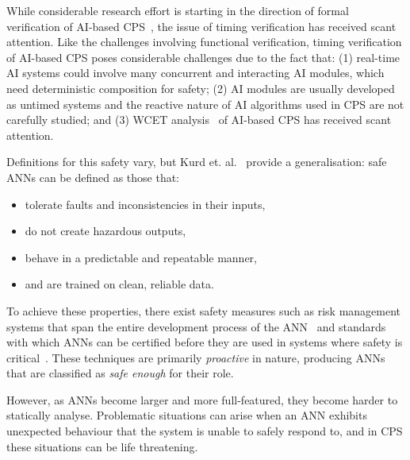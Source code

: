 While considerable research effort is starting in the direction of formal verification of \ac{AI}-based \ac{CPS}~\cite{seshia2016towards, russell2015}, the issue of timing verification has received scant attention. 
Like the challenges involving functional verification, timing verification of AI-based  \ac{CPS} poses considerable challenges due to the fact that: (1) real-time \ac{AI} systems could involve many concurrent and interacting \ac{AI} modules, which need deterministic composition for safety; (2) \ac{AI} modules are usually developed as untimed systems and the reactive nature of AI algorithms used in CPS are not carefully studied; and (3) \acf{WCET} analysis~\cite{wilhelm2008worst} of \ac{AI}-based \ac{CPS} has received scant attention.

Definitions for this safety vary, but Kurd et. al.~\cite{EstSafeCriteria2003} provide a generalisation: safe \acp{ANN} can be defined as those that:
\begin{itemize}
	\item tolerate faults and inconsistencies in their inputs,
	\item do not create hazardous outputs,
	\item behave in a predictable and repeatable manner,
	\item and are trained on clean, reliable data. 
\end{itemize}

To achieve these properties, there exist safety measures such as risk management systems that span the entire development process of the \ac{ANN}~\cite{ANNDevModel1999} and standards with which \acp{ANN} can be certified before they are used in systems where safety is critical~\cite{SCANNStandard}. 
These techniques are primarily \textit{proactive} in nature, producing \acp{ANN} that are classified as \textit{safe enough} for their role. 

However, as \acp{ANN} become larger and more full-featured, they  become harder to statically analyse.
Problematic situations can arise when an \ac{ANN} exhibits unexpected behaviour that the system is unable to safely respond to, and in \ac{CPS} these situations can be life threatening.

